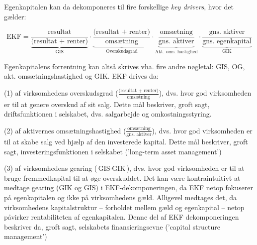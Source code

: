 \documentclass[10pt,reqno, usenames]{article}
\begin{document}
Egenkapitalen kan da dekomponeres til fire forskellige \textit{key drivers}, hvor det gælder: 

\begin{equation}
    \text{EKF} =  \underbrace{\frac{\text{resultat}}{\text{(resultat + renter)}}}_{\text{GIS}} \cdot \underbrace{\frac{\text{(resultat + renter)}}{\text{omsætning}}}_{\text{Overskudsgrad}} \cdot \underbrace{\frac{\text{omsætning}}{\text{gns. aktiver}}}_{\text{Akt. oms. hastighed}} \cdot \underbrace{\frac{\text{gns. aktiver}}{\text{gns. egenkapital}} }_{\text{GIK}}
\end{equation}

Egenkapitalens forrentning kan altså skrives vha. fire andre nøgletal: GIS, OG, akt. omsætningshastighed og GIK. EKF drives da:

\vspace{10 pt}

(1) af virksomhedens overskudsgrad ($\frac{\text{(resultat + renter)}}{\text{omsætning}}$), dvs. hvor god virksomheden er til at genere overskud af sit salg. Dette mål beskriver, groft sagt, driftsfunktionen i selskabet, dvs. salgarbejde og omkostningsstyring. 

\vspace{10 pt}

(2) af aktivernes omsætningshastighed ($\frac{\text{omsætning}}{\text{gns. aktiver}}$), dvs. hvor god virksomheden er til at skabe salg ved hjælp af den investerede kapital. Dette mål beskriver, groft sagt, investeringsfunktionen i selskabet ('long-term asset management') 

\vspace{10 pt}

(3) af virksomhedens gearing ($\text{GIS} \cdot \text{GIK}$), dvs. hvor god virksomheden er til at bruge fremmedkapital til at øge overskuddet. Det kan være kontraintuitivt at medtage gearing (GIK og GIS) i EKF-dekomponeringen, da EKF netop fokuserer på egenkapitalen og ikke på virksomhedens gæld. Alligevel medtages det, da virksomhedens kapitalstruktur – forholdet mellem gæld og egenkapital – netop påvirker rentabiliteten af egenkapitalen. Denne del af EKF dekomponeringen beskriver da, groft sagt, selskabets finansieringsevne ('capital structure management') 
\end{document}
